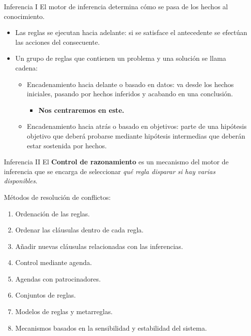 \documentclass[usenames,dvipsnames,aspectratio=169]{beamer}
\begin{document}
\begin{frame}{Inferencia I}
	El motor de inferencia determina cómo se pasa de los hechos al conocimiento.
	\begin{itemize}
		\item Las reglas se ejecutan hacia adelante: si se satisface el antecedente se efectúan las acciones del consecuente.
		\item Un grupo de reglas que contienen un problema y una solución se llama cadena:
		\begin{itemize}
			\item Encadenamiento hacia delante o basado en datos: va desde los hechos iniciales, pasando por hechos inferidos y acabando en una conclusión.
			\begin{itemize}
				\item \textbf{Nos centraremos en este.}
			\end{itemize}
			\item Encadenamiento hacia atrás o basado en objetivos: parte de una hipótesis objetivo que deberá probarse mediante hipótesis intermedias que deberán estar sostenida por hechos.
		\end{itemize}
	\end{itemize}
\end{frame}

\begin{frame}{Inferencia II}
	El \textbf{Control de razonamiento} es un mecanismo del motor de inferencia que se encarga de seleccionar \textit{qué regla disparar si hay varias disponibles}.
	
	Métodos de resolución de conflictos:
	\begin{enumerate}
		\item Ordenación de las reglas.
		\item Ordenar las cláusulas dentro de cada regla.
		\item Añadir nuevas cláusulas relacionadas con las inferencias.
		\item Control mediante agenda.
		\item Agendas con patrocinadores.
		\item Conjuntos de reglas.
		\item Modelos de reglas y metarreglas.
		\item Mecanismos basados en la sensibilidad y estabilidad del sistema.
	\end{enumerate}
\end{frame}
\end{document}
